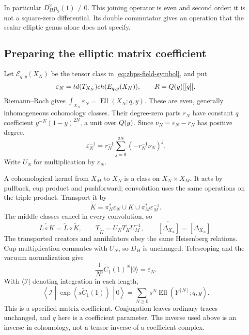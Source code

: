 In particular \(D_H^2p_2(1)\ne0\).  This joining operator is
even and second order; it is not a square-zero differential.
Its double commutator gives an operation that the scalar
elliptic genus alone does not specify.

\subsection{Preparing the elliptic matrix coefficient}
\label{subsec:zbps-elliptic-transport}

Let \(\mathcal E_{q,y}(X_N)\) be the tensor class in
\eqref{eq:zbps-field-symbol}, and put
\[
 \varepsilon_N=td(T_{X_N})
                 ch(E_{q,y}(X_N)),
 \qquad R=Q(y)[[q]].
\]
Riemann--Roch gives
\(\int_{X_N}\varepsilon_N=\operatorname{Ell}(X_N;q,y)\).
These are even, generally inhomogeneous cohomology classes.
Their degree-zero parts \(r_N\) have constant \(q\) coefficient
\(y^{-N}(1-y)^{2N}\), a unit over \(Q(y)\).  Since
\(\nu_N=\varepsilon_N-r_N\) has positive degree,
\[
 \varepsilon_N^{-1}=r_N^{-1}
       \sum_{j=0}^{2N}(-r_N^{-1}\nu_N)^j.
\]
Write \(U_N\) for multiplication by \(\varepsilon_N\).

A cohomological kernel from \(X_M\) to \(X_N\) is a class on
\(X_N\times X_M\).  It acts by pullback, cup product and
pushforward; convolution uses the same operations on the triple
product.  Transport it by
\[
 \widetilde K=\pi_N^*\varepsilon_N\cup K
                         \cup\pi_M^*\varepsilon_M^{-1}.
\]
The middle classes cancel in every convolution, so
\[
 \widetilde{L\circ K}=\widetilde L\circ\widetilde K,
 \qquad T_{\widetilde K}=U_NT_KU_M^{-1},
 \qquad\widetilde{[\Delta_{X_N}]}=[\Delta_{X_N}].
\]
The transported creators and annihilators obey the same Heisenberg
relations.  Cup multiplication commutes with \(U_N\), so \(D_H\)
is unchanged.  Telescoping and the vacuum normalization give
\[
 \frac1{N!}\widetilde C_1(1)^N|0\rangle=\varepsilon_N.
\]
With \(\langle\mathcal I|\) denoting integration in each length,
\begin{equation}\label{eq:zbps-prepared-elliptic-state}
 \left\langle\mathcal I\middle|
       \exp(s\widetilde C_1(1))\middle|0\right\rangle
 =\sum_{N\ge0}s^N\operatorname{Ell}(Y^{[N]};q,y).
\end{equation}
This is a specified matrix coefficient.  Conjugation leaves
ordinary traces unchanged, and \(q\) here is a coefficient
parameter.  The inverse used above is an inverse in cohomology,
not a tensor inverse of a coefficient complex.

